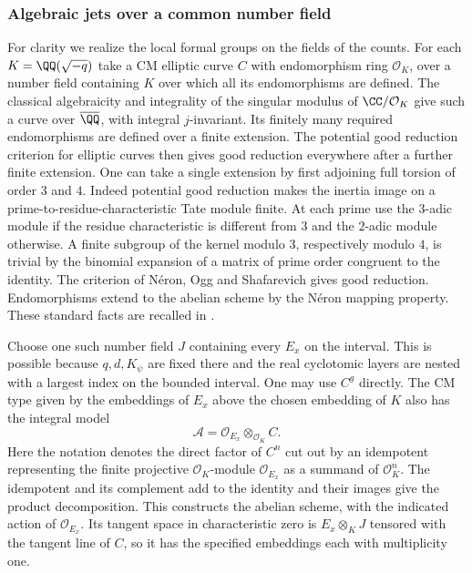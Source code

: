 \documentclass[a4paper,11pt]{article}
\theoremstyle{definition}
\theoremstyle{remark}
\numberwithin{equation}{section}
\newcommand{\OO}{\mathcal O}
\begin{document}
\subsubsection{Algebraic jets over a common number field}\label{nav:V-03}
For clarity we realize the local formal groups on the fields of the counts. For each \(K=\QQ(\sqrt{-q})\) take a CM elliptic curve \(C\) with endomorphism ring \(\OO_K\), over a number field containing \(K\) over which all its endomorphisms are defined. The classical algebraicity and integrality of the singular modulus of \(\CC/\OO_K\) give such a curve over \(\overline\QQ\), with integral \(j\)-invariant. Its finitely many required endomorphisms are defined over a finite extension. The potential good reduction criterion for elliptic curves then gives good reduction everywhere after a further finite extension. One can take a single extension by first adjoining full torsion of order \(3\) and \(4\). Indeed potential good reduction makes the inertia image on a prime-to-residue-characteristic Tate module finite. At each prime use the \(3\)-adic module if the residue characteristic is different from \(3\) and the \(2\)-adic module otherwise. A finite subgroup of the kernel modulo \(3\), respectively modulo \(4\), is trivial by the binomial expansion of a matrix of prime order congruent to the identity. The criterion of N\'eron, Ogg and Shafarevich gives good reduction. Endomorphisms extend to the abelian scheme by the N\'eron mapping property. These standard facts are recalled in \cite{XIII-X-IV-cm37,XIII-X-IV-silver37}.

Choose one such number field \(J\) containing every \(E_x\) on the interval. This is possible because \(q,d,K_\psi\) are fixed there and the real cyclotomic layers are nested with a largest index on the bounded interval. One may use \(C^g\) directly. The CM type given by the embeddings of \(E_x\) above the chosen embedding of \(K\) also has the integral model
\[
                \mathcal A=\OO_{E_x}\otimes_{\OO_K} C .
\]
Here the notation denotes the direct factor of \(C^n\) cut out by an idempotent representing the finite projective \(\OO_K\)-module \(\OO_{E_x}\) as a summand of \(\OO_K^n\). The idempotent and its complement add to the identity and their images give the product decomposition. This constructs the abelian scheme, with the indicated action of \(\OO_{E_x}\). Its tangent space in characteristic zero is \(E_x\otimes_K J\) tensored with the tangent line of \(C\), so it has the specified embeddings each with multiplicity one.
\end{document}
